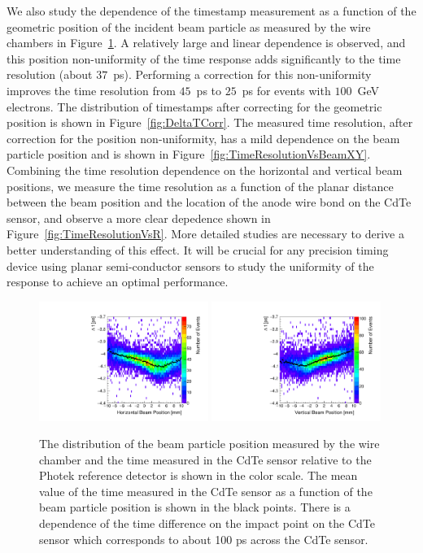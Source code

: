 We also study the dependence of the timestamp measurement as a function of the geometric
position of the incident beam particle as measured by the wire chambers in 
Figure~\ref{fig:DeltaTVsBeamXY}. A relatively large and linear dependence is observed, 
and this position non-uniformity of the time response adds significantly to the 
time resolution (about $37$~ps). Performing a correction for this non-uniformity improves
the time resolution from $45$~ps to $25$~ps for events with $100$~GeV electrons.
The distribution of timestamps after correcting for the geometric position is shown
in Figure~\ref{fig:DeltaTCorr}. The measured time resolution, after correction for
the position non-uniformity, has a mild dependence on the beam particle position 
and is shown in Figure~\ref{fig:TimeResolutionVsBeamXY}. Combining the time resolution
dependence on the horizontal and vertical beam positions, we measure the time resolution
as a function of the planar distance between the beam position and the location of the 
anode wire bond on the CdTe sensor, and observe a more clear depedence shown in 
Figure~\ref{fig:TimeResolutionVsR}. More detailed studies are necessary
to derive a better understanding of this effect. It will be crucial for any precision timing device
using planar semi-conductor sensors to study the uniformity of the response to achieve an optimal performance.
%
\begin{figure}[htbp] 
\centering
\includegraphics[width=0.49\textwidth]{figures/DeltaTVsHorizontalPosition.pdf} 
\includegraphics[width=0.49\textwidth]{figures/DeltaTVsVerticalPosition.pdf} 
\caption{ The distribution of the beam particle position measured by the wire chamber
and the time measured in the CdTe sensor relative to the Photek reference detector
is shown in the color scale. The mean value of the time measured in the CdTe sensor as a function
of the beam particle position is shown in the black points. There is a dependence of the time difference
on the impact point on the CdTe sensor which corresponds to about 100 ps across the CdTe sensor.} 
\label{fig:DeltaTVsBeamXY} 
\end{figure} 

